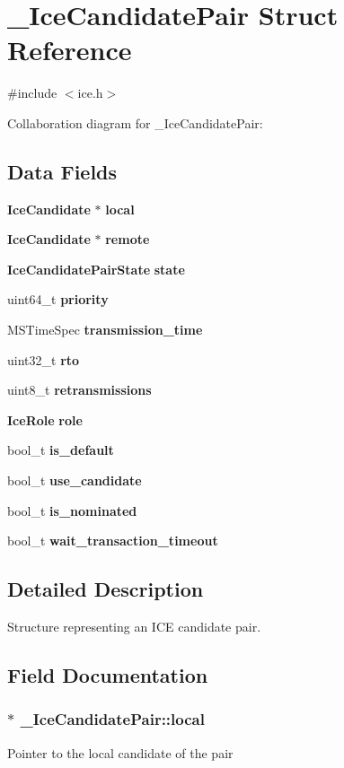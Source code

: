 \section{\-\_\-\-Ice\-Candidate\-Pair Struct Reference}
\label{struct__IceCandidatePair}


{\ttfamily \#include $<$ice.\-h$>$}



Collaboration diagram for \-\_\-\-Ice\-Candidate\-Pair\-:
\subsection*{Data Fields}
\begin{DoxyCompactItemize}
\item 
{\bf Ice\-Candidate} $\ast$ {\bf local}
\item 
{\bf Ice\-Candidate} $\ast$ {\bf remote}
\item 
{\bf Ice\-Candidate\-Pair\-State} {\bf state}
\item 
uint64\-\_\-t {\bf priority}
\item 
M\-S\-Time\-Spec {\bf transmission\-\_\-time}
\item 
uint32\-\_\-t {\bf rto}
\item 
uint8\-\_\-t {\bf retransmissions}
\item 
{\bf Ice\-Role} {\bf role}
\item 
bool\-\_\-t {\bf is\-\_\-default}
\item 
bool\-\_\-t {\bf use\-\_\-candidate}
\item 
bool\-\_\-t {\bf is\-\_\-nominated}
\item 
bool\-\_\-t {\bf wait\-\_\-transaction\-\_\-timeout}
\end{DoxyCompactItemize}


\subsection{Detailed Description}
Structure representing an I\-C\-E candidate pair. 

\subsection{Field Documentation}
\subsubsection[{local}]{$\ast$ \-\_\-\-Ice\-Candidate\-Pair\-::local}\label{struct__IceCandidatePair_a041aa630a7cea25cb26be5101d4e8f03}
Pointer to the local candidate of the pair 
